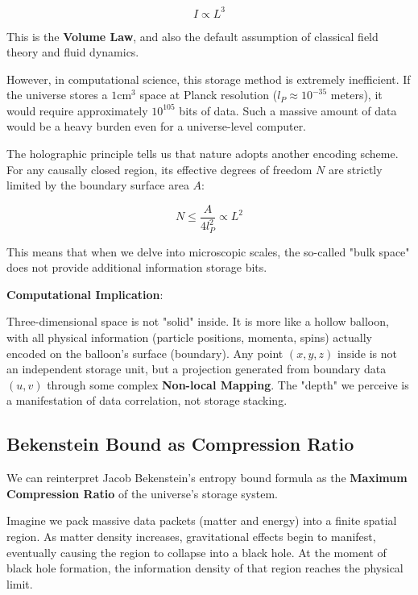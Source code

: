 \begin{equation}
I \propto L^3
\end{equation}

This is the \textbf{Volume Law}, and also the default assumption of classical field theory and fluid dynamics.

However, in computational science, this storage method is extremely inefficient. If the universe stores a $1 \text{cm}^3$ space at Planck resolution ($l_P \approx 10^{-35}$ meters), it would require approximately $10^{105}$ bits of data. Such a massive amount of data would be a heavy burden even for a universe-level computer.

The holographic principle tells us that nature adopts another encoding scheme. For any causally closed region, its effective degrees of freedom $N$ are strictly limited by the boundary surface area $A$:

\begin{equation}
N \le \frac{A}{4l_P^2} \propto L^2
\end{equation}

This means that when we delve into microscopic scales, the so-called "bulk space" does not provide additional information storage bits.

\textbf{Computational Implication}:

Three-dimensional space is not "solid" inside. It is more like a hollow balloon, with all physical information (particle positions, momenta, spins) actually encoded on the balloon's surface (boundary). Any point $(x, y, z)$ inside is not an independent storage unit, but a projection generated from boundary data $(u, v)$ through some complex \textbf{Non-local Mapping}. The "depth" we perceive is a manifestation of data correlation, not storage stacking.

\subsection{Bekenstein Bound as Compression Ratio}

We can reinterpret Jacob Bekenstein's entropy bound formula as the \textbf{Maximum Compression Ratio} of the universe's storage system.

Imagine we pack massive data packets (matter and energy) into a finite spatial region. As matter density increases, gravitational effects begin to manifest, eventually causing the region to collapse into a black hole. At the moment of black hole formation, the information density of that region reaches the physical limit.

